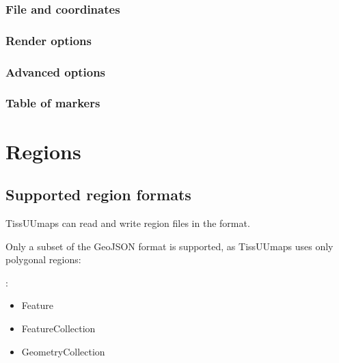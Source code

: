\documentclass[letterpaper,10pt,english,openany,oneside]{sphinxmanual}
\begin{document}
\subsubsection{File and coordinates}
\label{\detokenize{docs/starting/markers:file-and-coordinates}}

\subsubsection{Render options}
\label{\detokenize{docs/starting/markers:render-options}}

\subsubsection{Advanced options}
\label{\detokenize{docs/starting/markers:advanced-options}}

\subsubsection{Table of markers}
\label{\detokenize{docs/starting/markers:table-of-markers}}
\sphinxstepscope


\section{Regions}
\label{\detokenize{docs/starting/regions:regions}}\label{\detokenize{docs/starting/regions::doc}}

\subsection{Supported region formats}
\label{\detokenize{docs/starting/regions:supported-region-formats}}
\sphinxAtStartPar
TissUUmaps can read and write region files in the  format.

\sphinxAtStartPar
Only a subset of the GeoJSON format is supported, as TissUUmaps uses only polygonal regions:

\sphinxAtStartPar
{}:
\begin{itemize}
\item {} 
\sphinxAtStartPar
Feature

\item {} 
\sphinxAtStartPar
FeatureCollection

\item {} 
\sphinxAtStartPar
GeometryCollection

\end{itemize}
\end{document}
